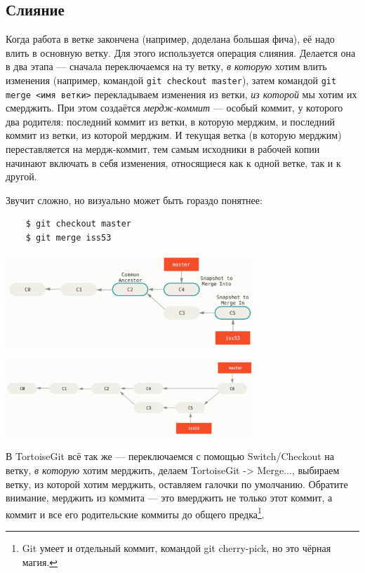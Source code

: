 \documentclass{../../text-style}
\begin{document}
\subsection{Слияние}

Когда работа в ветке закончена (например, доделана большая фича), её надо влить в основную ветку. Для этого используется операция слияния. Делается она в два этапа --- сначала переключаемся на ту ветку, \emph{в которую} хотим влить изменения (например, командой \verb|git checkout master|), затем командой \verb|git merge <имя ветки>| перекладываем изменения из ветки, \emph{из которой} мы хотим их смерджить. При этом создаётся \emph{мердж-коммит} --- особый коммит, у которого два родителя: последний коммит из ветки, в которую мерджим, и последний коммит из ветки, из которой мерджим. И текущая ветка (в которую мерджим) переставляется на мердж-коммит, тем самым исходники в рабочей копии начинают включать в себя изменения, относящиеся как к одной ветке, так и к другой. 

Звучит сложно, но визуально может быть гораздо понятнее:

\begin{verbatim}
    $ git checkout master
    $ git merge iss53
\end{verbatim}
\begin{center}
    \includegraphics[width=0.7\textwidth]{merge.png}
\end{center}
\begin{center}
    \includegraphics[width=0.7\textwidth]{mergeResult.png}
\end{center}

В TortoiseGit всё так же --- переключаемся с помощью Switch/Checkout на ветку, \emph{в которую} хотим мерджить, делаем TortoiseGit -> Merge..., выбираем ветку, из которой хотим мерджить, оставляем галочки по умолчанию. Обратите внимание, мерджить из коммита --- это вмерджить не только этот коммит, а коммит и все его родительские коммиты до общего предка\footnote{Git умеет и отдельный коммит, командой git cherry-pick, но это чёрная магия.}.
\end{document}
